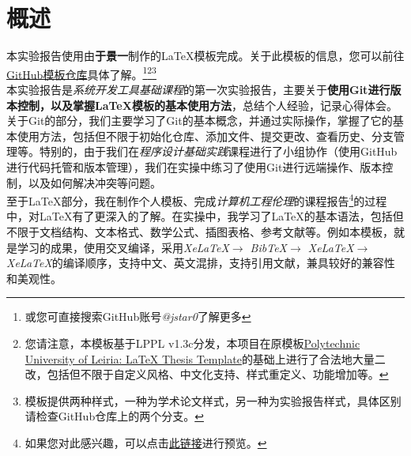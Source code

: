 \thispagestyle{plain} %
\chapter*{概述} %

本实验报告使用由\textbf{于景一}制作的\LaTeX{}模板完成。关于此模板的信息，您可以前往\href{https://github.com/jstar0/LaTeXTemplate/}{GitHub模板仓库}具体了解。\footnote{或您可直接搜索GitHub账号\textit{@jstar0}了解更多}\footnote{您请注意，本模板基于LPPL v1.3c分发，本项目在原模板\href{https://github.com/joseareia/ipleiria-thesis}{Polytechnic University of Leiria: LaTeX Thesis Template}的基础上进行了合法地大量二改，包括但不限于自定义风格、中文化支持、样式重定义、功能增加等。}\footnote{模板提供两种样式，一种为学术论文样式，另一种为实验报告样式，具体区别请检查GitHub仓库上的两个分支。}\\

本实验报告是\textit{系统开发工具基础课程}的第一次实验报告，主要关于\textbf{使用Git进行版本控制，以及掌握\LaTeX{}模板的基本使用方法}，总结个人经验，记录心得体会。 \\

关于Git的部分，我们主要学习了Git的基本概念，并通过实际操作，掌握了它的基本使用方法，包括但不限于初始化仓库、添加文件、提交更改、查看历史、分支管理等。特别的，由于我们在\textit{程序设计基础实践}课程进行了小组协作（使用GitHub进行代码托管和版本管理），我们在实操中练习了使用Git进行远端操作、版本控制，以及如何解决冲突等问题。\\

至于\LaTeX{}部分，我在制作个人模板、完成\textit{计算机工程伦理}的课程报告\footnote{如果您对此感兴趣，可以点击\href{https://xinera-my.sharepoint.com/:b:/g/personal/i_mcxin_top/EZ0DMB5suB5Dgu74rP2IwnsBF8CHPOEvkMRq40TBv-3rSQ?e=dU1OTj}{此链接}进行预览。}的过程中，对\LaTeX{}有了更深入的了解。在实操中，我学习了\LaTeX{}的基本语法，包括但不限于文档结构、文本格式、数学公式、插图表格、参考文献等。例如本模板，就是学习的成果，使用交叉编译，采用\textit{XeLaTeX$\rightarrow$ BibTeX$\rightarrow$ XeLaTeX$\rightarrow$ XeLaTeX}的编译顺序，支持中文、英文混排，支持引用文献，兼具较好的兼容性和美观性。\\

